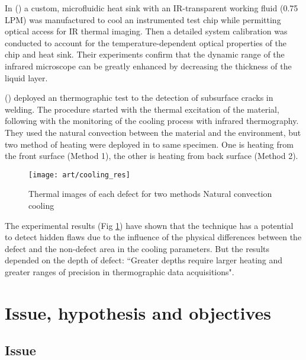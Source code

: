 In (\citet{2012-LewisHom}) a custom, microfluidic  heat  sink  with  an  IR-transparent working  fluid  (0.75  LPM)  was  manufactured  to  cool  an instrumented test chip while permitting optical access for IR thermal imaging.  Then a detailed system calibration was conducted to account for the temperature-dependent optical properties of the chip and heat sink. Their experiments  confirm  that  the  dynamic  range  of  the infrared  microscope  can  be  greatly  enhanced  by decreasing the  thickness  of  the  liquid  layer. 

(\citet{rodriguez2014cooling}) deployed an thermographic test to the detection of subsurface cracks in welding. The procedure started with the thermal excitation of the material, following with the monitoring of the cooling process with infrared thermography. They used the natural convection between the material and the environment, but two method of heating were deployed in to same specimen. One is heating from the front surface (Method 1), the other is heating from back surface (Method 2). 

\begin{figure}
	\hspace{-45pt}
	\texttt{[image: art/cooling\_res]}
	\caption{Thermal images of each defect for two methods Natural convection cooling}
	\label{cooling_res}
\end{figure}
The experimental results (Fig \ref{cooling_res}) have shown that the technique has a potential to detect hidden flaws due to the influence of the physical differences between the defect and the non-defect area in the cooling parameters. But the results depended on the depth of defect: ``Greater depths require larger heating and greater ranges of precision in thermographic data acquisitions".

%



\section*{Issue, hypothesis and objectives}
\subsection{Issue}

